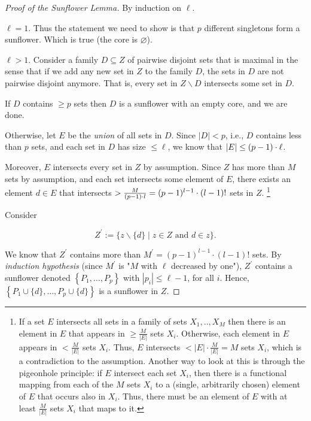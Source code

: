 \begin{proof}[Proof of the Sunflower Lemma]
By induction on $\ell$.

\Base  $\ell=1$. Thus the statement we need to show is that $p$ different singletons form a sunflower. Which is true (the core is $\varnothing$).


\induction $\ell>1$. Consider a family $D \subseteq Z$ of pairwise disjoint sets that is maximal in the sense that if we add any new set in $Z$ to the family $D$, the sets in $D$ are not pairwise disjoint anymore. That is, every set in $Z \backslash D$ intersects some set in $D$.

 If $D$ contains $\geq p$ sets then $D$ is a sunflower with an empty core, and we are done.

 Otherwise, let $E$ be the \emph{union} of all sets in $D$.
Since $|D|<p$, i.e., $D$ contains less than $p$ sets, and each set in $D$ has size $\le \ell$, we know that $|E| \leq(p-1)\cdot\ell$.

\medskip 

Moreover, $E$ intersects every set in $Z$ by assumption.
Since $Z$ has more than $M$ sets by assumption, and each set intersects some element of $E$, there exists an element $d \in E$ that intersects $>\frac{M}{(p-1)\cdot l}=(p-1)^{l-1} \cdot(l-1)!$ sets in $Z$.
\footnote{If a set $E$ intersects all sets in a family of sets $X_1, . ., X_M$ then there is an element in $E$ that appears in $\geq \frac{M}{|E|}$ sets $X_i$.
Otherwise, each element in $E$ appears in $<\frac{M}{|E|}$ sets $X_i$. Thus, $E$ intersects $<|E| \cdot \frac{M}{|E|}=M$ sets $X_i$, which is a contradiction to the assumption. Another way to look at this is through the pigeonhole principle: if $E$ intersect each set $X_i$, then there is a functional mapping from each of the $M$ sets $X_i$ to a (single, arbitrarily chosen) element of $E$ that occurs also in $X_i$. Thus, there must be an element of $E$ with at least $\frac{M}{|E|}$ sets $X_i$ that maps to it.}

Consider

$$
Z^{\prime}:=\{z \backslash\{d\} \mid z \in Z \text { and } d \in z\} .
$$


We know that $Z^{\prime}$ contains more than $M^{\prime}=(p-1)^{l-1} \cdot(l-1)!$ sets.
By \emph{induction hypothesis} (since $M^{\prime}$ is "$M$ with $\ell$ decreased by one"), $Z^{\prime}$ contains a sunflower denoted $\left\{P_1, \ldots, P_p\right\}$ with $\left|p_i\right| \leq \ell-1$, for all $i$.
Hence, $\left\{P_1 \cup\{d\}, \ldots, P_p \cup\{d\}\right\}$ is a sunflower in $Z$.
\end{proof}


